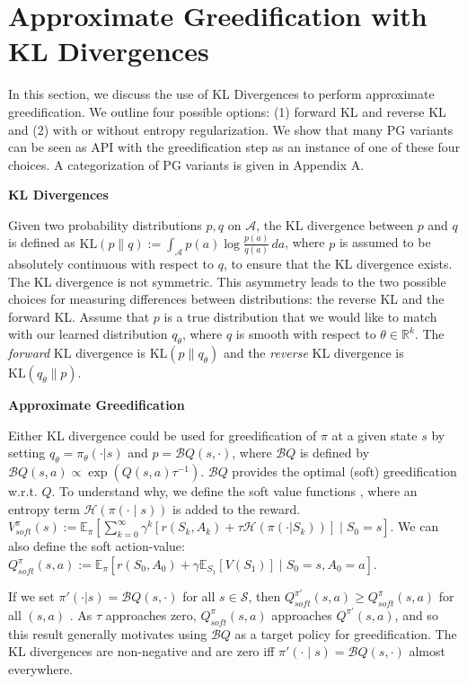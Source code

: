 \documentclass[twoside,11pt]{article}
\newcommand{\Ex}{\mathbb{E}}
\newcommand{\R}{\mathbb{R}}
\newcommand{\statespace}{\mathcal{S}}
\newcommand{\actionspace}{\mathcal{A}}
\newcommand{\Qhat}{{Q}}
\newcommand{\KL}{\mathrm{KL}}
\newcommand{\policyparams}{\theta}
\newcommand{\boltzmannQ}{\mathcal{B}Q}
\newcommand{\entropy}{\mathcal{H}}
\newcommand{\defeq}{:=}
\begin{document}
\section{Approximate Greedification with KL Divergences}\label{sec:sac}

In this section, we discuss the use of KL Divergences to perform approximate greedification. We outline four possible options: (1) forward KL and reverse KL and (2) with or without entropy regularization. We show that many PG variants can be seen as API with the greedification step as an instance of one of these four choices. A categorization of PG variants is given in Appendix A. 

\textbf{KL Divergences}

Given two probability distributions $p, q$ on $\actionspace$, the KL divergence between $p$ and $q$ is defined as $ \KL(p \parallel q) \defeq \int_\actionspace p(a) \log\frac{p(a)}{q(a)}\, da$,
%
where $p$ is assumed to be {absolutely continuous} \citep{billingsley2008probability} with respect to $q$, to ensure that the KL divergence exists. 
%
The KL divergence is not symmetric. This asymmetry leads to the two possible choices for measuring differences between distributions: the reverse KL and the forward KL. Assume that $p$ is a true distribution that we would like to match with our learned distribution $q_\theta$, where  $q$ is smooth with respect to $\theta \in \R^k$. The \textit{forward} KL divergence is $\KL(p \parallel q_\theta)$ and the \textit{reverse} KL divergence is $\KL(q_\theta \parallel p)$. 


\textbf{Approximate Greedification}

Either KL divergence could be used for greedification of $\pi$ at a given state $s$ by setting $q_\theta = \pi_\policyparams(\cdot | s)$ and $p =  \boltzmannQ(s, \cdot)$, where $\boltzmannQ$ is defined by $\boltzmannQ(s, a) \propto \exp(\Qhat(s, a)\tau^{-1})$.
%
$\boltzmannQ$ provides the optimal (soft) greedification w.r.t. $\Qhat$. To understand why, we define the soft value functions \citep{ziebart2010modeling}, where an entropy term $\entropy(\pi(\cdot \mid s))$ is added to the reward. $V^{\pi}_{soft}(s) \defeq  \Ex_\pi\left[ \sum_{k = 0}^\infty \gamma^k \left[ r(S_k, A_k) + \tau \entropy(\pi(\cdot|S_k))\right] \mid S_0 = s \right]$. We can also define the soft action-value: $Q^{\pi}_{soft}(s,a) \defeq  \Ex_\pi\left[ r(S_0, A_0) + \gamma \Ex_{S_1}[V(S_1)] \mid S_0 = s, A_0 = a \right]$.

If we set $\pi'(\cdot | s) = \boltzmannQ(s, \cdot)$ for all $s \in \statespace$, then $Q^{\pi'}_{soft}(s,a) \ge Q^{\pi}_{soft}(s,a)$ for all $(s,a)$ \citep[Theorem 4]{haarnoja2017reinforcement}. As $\tau$ approaches zero, $Q^{\pi}_{soft}(s,a)$ approaches $Q^{\pi'}(s,a)$, and so this result generally motivates using $\boltzmannQ$ as a target policy for greedification. The KL divergences are non-negative and are zero iff $\pi'(\cdot \mid s) = \boltzmannQ(s, \cdot)$ almost everywhere.  
\end{document}
